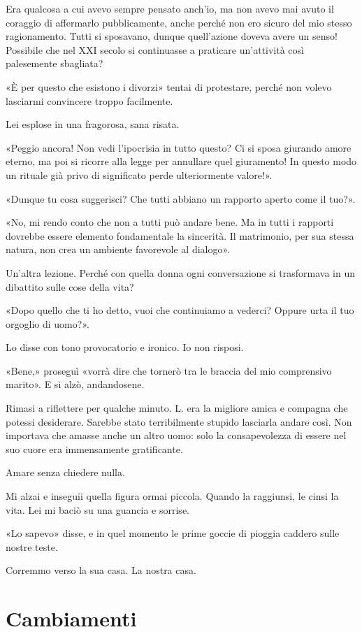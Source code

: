 \documentclass[a4paper,10pt]{memoir}
\begin{document}
Era qualcosa a cui avevo sempre pensato anch'io, ma non avevo mai avuto il coraggio di affermarlo pubblicamente, anche
perché non ero sicuro del mio stesso ragionamento. Tutti si sposavano, dunque quell'azione doveva avere un senso!
Possibile che nel XXI secolo si continuasse a praticare un'attività così palesemente sbagliata?

«È per questo che esistono i divorzi» tentai di protestare, perché non volevo lasciarmi convincere troppo facilmente.

Lei esplose in una fragorosa, sana risata.

«Peggio ancora! Non vedi l'ipocrisia in tutto questo? Ci si sposa giurando amore eterno, ma poi si ricorre alla legge
per annullare quel giuramento! In questo modo un rituale già privo di significato perde ulteriormente valore!».

«Dunque tu cosa suggerisci? Che tutti abbiano un rapporto aperto come il tuo?».

«No, mi rendo conto che non a tutti può andare bene. Ma in tutti i rapporti dovrebbe essere elemento fondamentale la
sincerità. Il matrimonio, per sua stessa natura, non crea un ambiente favorevole al dialogo».

Un'altra lezione. Perché con quella donna ogni conversazione si trasformava in un dibattito sulle cose della vita?

«Dopo quello che ti ho detto, vuoi che continuiamo a vederci? Oppure urta il tuo orgoglio di uomo?».

Lo disse con tono provocatorio e ironico. Io non risposi.

«Bene,» proseguì «vorrà dire che tornerò tra le braccia del mio comprensivo marito». E si alzò, andandosene.

Rimasi a riflettere per qualche minuto. L. era la migliore amica e compagna che potessi desiderare. Sarebbe stato
terribilmente stupido lasciarla andare così. Non importava che amasse anche un altro uomo: solo la consapevolezza di
essere nel suo cuore era immensamente gratificante.

Amare senza chiedere nulla.

Mi alzai e inseguii quella figura ormai piccola. Quando la raggiunsi, le cinsi la vita. Lei mi baciò su una guancia e
sorrise.

«Lo sapevo» disse, e in quel momento le prime goccie di pioggia caddero sulle nostre teste.

Corremmo verso la sua casa. La nostra casa.

\chapter{Cambiamenti}
\end{document}
